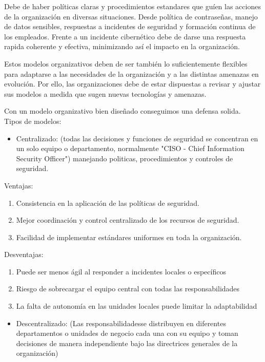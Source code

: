 \documentclass{article}
\begin{document}
Debe de haber políticas claras y procedimientos estandares que guíen las acciones
de la organización en diversas situaciones. Desde política de contraseñas, manejo
de datos sensibles, respuestas a incidentes de seguridad y formación continua
de los empleados. Frente a un incidente cibernético debe de darse una respuesta
rapida coherente y efectiva, minimizando así el impacto en la organización.

Estos modelos organizativos deben de ser también lo suficientemente flexibles para
adaptarse a las necesidades de la organización y a las distintas amenazas en
evolución. Por ello, las organizaciones debe de estar dispuestas a revisar y ajustar
sus modelos a medida que sugen nuevas tecnologías y amenazas.

Con un modelo organizativo bien diseñado conseguimos una defensa solida.\\

\qquad Tipos de modelos:

\begin{itemize}
	\item Centralizado: (todas las decisiones y funciones de seguridad se concentran
		en un solo equipo o departamento, normalmente "CISO - Chief Information
		Security Officer") manejando politicas, procedimientos y controles de
		seguridad.
\end{itemize}

Ventajas:

\begin{enumerate}
	\item Consistencia en la aplicación de las políticas de seguridad.
	\item Mejor coordinación y control centralizado de los recursos de seguridad.
	\item Facilidad de implementar estándares uniformes en toda la organización.
\end{enumerate}

Desventajas:

\begin{enumerate}
	\item Puede ser menos ágil al responder a incidentes locales o específicos
	\item Riesgo de sobrecargar el equipo central con todas las responsabilidades
	\item La falta de autonomía en las unidades locales puede limitar la adaptabilidad
\end{enumerate}

\begin{itemize}
	\item Descentralizado: (Las responsabilidadesse distribuyen en diferentes
	departamentos o unidades de negocio cada una con su equipo y toman decisiones
	de manera independiente bajo las directrices generales de la organización)
\end{itemize}
\end{document}
